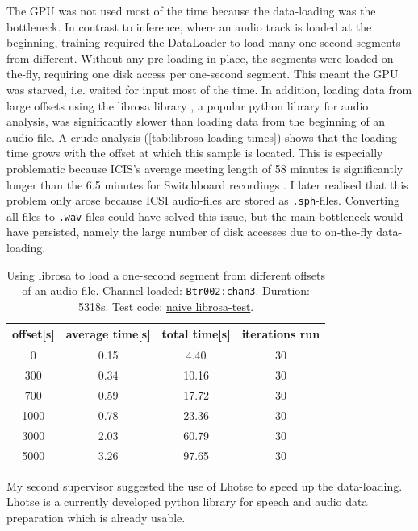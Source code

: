 \documentclass[bsc,frontabs,parskip,deptreport]{infthesis}
\begin{document}
The GPU was not used most of the time because the data-loading was the bottleneck. In contrast to inference, where an audio track is loaded at the beginning, training required the DataLoader to load many one-second segments from different. 
Without any pre-loading in place, the segments were loaded on-the-fly, requiring one disk access per one-second segment. This meant the GPU was starved, i.e. waited for input most of the time. 
In addition, loading data from large offsets using the librosa library \citep{mcfee2015librosa}, a popular python library for audio analysis, was significantly slower than loading data from the beginning of an audio file. A crude analysis (\autoref{tab:librosa-loading-times}) shows that the loading time grows with the offset at which this sample is located. 
This is especially problematic because ICIS's average meeting length of 58 minutes \citep{icsi-ldc} is significantly longer than the 6.5 minutes for Switchboard recordings \citep{switchboard-ldc}.
I later realised that this problem only arose because ICSI audio-files are stored as \verb|.sph|-files. Converting all files to \verb|.wav|-files could have solved this issue, but the main bottleneck would have persisted, namely the large number of disk accesses due to on-the-fly data-loading.

\begin{table}[h!]
    \centering
    \begin{tabular}{|c|c|c|c|}
    \hline
    offset[s] & average time[s] & total time[s] & iterations run \\
    \hline
    0  & 0.15 & 4.40 & 30    \\
    300 & 0.34 & 10.16 & 30  \\ 
    700 & 0.59 & 17.72 & 30  \\
    1000 & 0.78 & 23.36 & 30 \\  
    3000 & 2.03 & 60.79 & 30 \\
    5000 & 3.26 & 97.65 & 30 \\
    \hline
    \end{tabular}
    \caption{Using librosa \citep{mcfee2015librosa} to load a one-second segment from different offsets of an audio-file. Channel loaded: \texttt{Btr002:chan3}. Duration: 5318s. Test code: \href{https://github.com/LasseWolter/laughter-detection-icsi/tree/main/misc_scripts}{naive librosa-test}.}
    \label{tab:librosa-loading-times}
\end{table}


My second supervisor suggested the use of Lhotse \citep{zelasko2021lhotse} to speed up the data-loading. Lhotse is a currently developed python library for speech and audio data preparation which is already usable.
\end{document}
